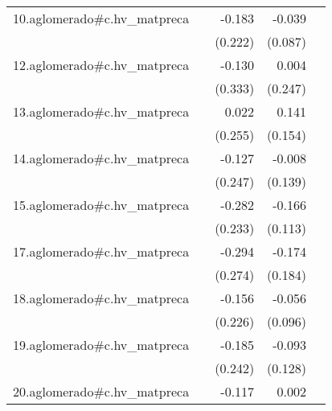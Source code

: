 {\begin{longtable}{l*{4}{D{.}{.}{-1}}}
\addlinespace
10.aglomerado#c.hv\_matpreca&                     &      -0.183         &      -0.039         &                     \\
            &                     &     (0.222)         &     (0.087)         &                     \\
\addlinespace
12.aglomerado#c.hv\_matpreca&                     &      -0.130         &       0.004         &                     \\
            &                     &     (0.333)         &     (0.247)         &                     \\
\addlinespace
13.aglomerado#c.hv\_matpreca&                     &       0.022         &       0.141         &                     \\
            &                     &     (0.255)         &     (0.154)         &                     \\
\addlinespace
14.aglomerado#c.hv\_matpreca&                     &      -0.127         &      -0.008         &                     \\
            &                     &     (0.247)         &     (0.139)         &                     \\
\addlinespace
15.aglomerado#c.hv\_matpreca&                     &      -0.282         &      -0.166         &                     \\
            &                     &     (0.233)         &     (0.113)         &                     \\
\addlinespace
17.aglomerado#c.hv\_matpreca&                     &      -0.294         &      -0.174         &                     \\
            &                     &     (0.274)         &     (0.184)         &                     \\
\addlinespace
18.aglomerado#c.hv\_matpreca&                     &      -0.156         &      -0.056         &                     \\
            &                     &     (0.226)         &     (0.096)         &                     \\
\addlinespace
19.aglomerado#c.hv\_matpreca&                     &      -0.185         &      -0.093         &                     \\
            &                     &     (0.242)         &     (0.128)         &                     \\
\addlinespace
20.aglomerado#c.hv\_matpreca&                     &      -0.117         &       0.002         &                     \\

\end{longtable}}
